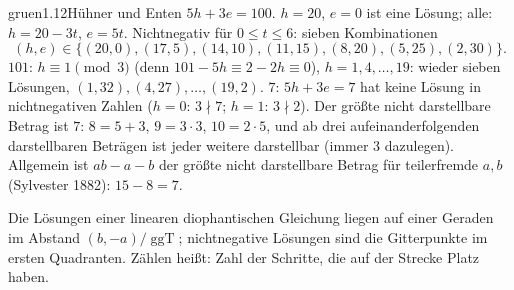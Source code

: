 \begin{loesungkarte}{gruen}{1.12}{Hühner und Enten}
$5h + 3e = 100$. $h = 20$, $e = 0$ ist eine Lösung; alle: $h = 20 - 3t$, $e = 5t$. Nichtnegativ für $0\le t\le6$: sieben Kombinationen
\[ (h, e)\in\{(20, 0), (17, 5), (14, 10), (11, 15), (8, 20), (5, 25), (2, 30)\} . \]
$101$: $h\equiv1\pmod3$ (denn $101 - 5h\equiv2 - 2h\equiv0$), $h = 1, 4, \dots, 19$: wieder sieben Lösungen, $(1, 32), (4, 27), \dots, (19, 2)$. $7$: $5h + 3e = 7$ hat keine Lösung in nichtnegativen Zahlen ($h = 0$: $3\nmid7$; $h = 1$: $3\nmid2$).
Der größte nicht darstellbare Betrag ist $7$: $8 = 5 + 3$, $9 = 3\cdot3$, $10 = 2\cdot5$, und ab drei aufeinanderfolgenden darstellbaren Beträgen ist jeder weitere darstellbar (immer $3$ dazulegen). Allgemein ist $ab - a - b$ der größte nicht darstellbare Betrag für teilerfremde $a, b$ (Sylvester 1882): $15 - 8 = 7$. \checkmark
\begin{center}
\end{center}
\begin{mitnehmen}\kastentext
Die Lösungen einer linearen diophantischen Gleichung liegen auf einer Geraden im Abstand $(b, -a)/\operatorname{ggT}$; nichtnegative Lösungen sind die Gitterpunkte im ersten Quadranten. Zählen heißt: Zahl der Schritte, die auf der Strecke Platz haben.
\end{mitnehmen}
\end{loesungkarte}

